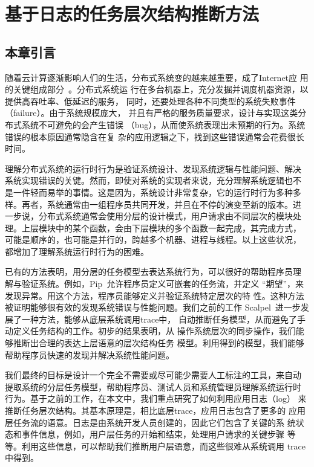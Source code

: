 \chapter{基于日志的任务层次结构推断方法}
\label{chap:logmining}

\section{本章引言}

随着云计算逐渐影响人们的生活，分布式系统变的越来越重要，成了Internet应
用的关键组成部分~\cite{gfs, mapreduce, bigtable, dynamo}。分布式系统运
行在多台机器上，充分发掘并调度机器资源，以提供高吞吐率、低延迟的服务，
同时，还要处理各种不同类型的系统失败事件（failure）。由于系统规模庞大，
并且有严格的服务质量要求，设计与实现这类分布式系统不可避免的会产生错误
（bug），从而使系统表现出未预期的行为。系统错误的根本原因通常隐含在复
杂的应用逻辑之下，找到这些错误通常会花费很长时间。

理解分布式系统的运行时行为是验证系统设计、发现系统逻辑与性能问题、解决
系统实现错误的关键。然而，即使对系统的实现者来说，充分理解系统逻辑也不
是一件轻而易举的事情。这是因为，系统设计非常复杂，它的运行时行为多种多
样。再者，系统通常由一组程序员共同开发，并且在不停的演变至新的版本。进
一步说，分布式系统通常会使用分层的设计模式，用户请求由不同层次的模块处
理。上层模块中的某个函数，会由下层模块的多个函数一起完成，其完成方式，
可能是顺序的，也可能是并行的，跨越多个机器、进程与线程。以上这些状况，
都增加了理解系统运行时行为的困难。

已有的方法表明，用分层的任务模型去表达系统行为，可以很好的帮助程序员理
解与验证系统。例如，Pip~\cite{pip}允许程序员定义可嵌套的任务流，并定义
“期望”，来发现异常。用这个方法，程序员能够定义并验证系统特定层次的特
性。这种方法被证明能够很有效的发现系统错误与性能问题。我们之前的工作
Scalpel~\cite{scalpel}进一步发展了一种方法，能够从底层系统调用trace中，
自动推断任务模型，从而避免了手动定义任务结构的工作。初步的结果表明，从
操作系统层次的同步操作，我们能够推断出合理的表达上层语意的层次结构任务
模型。利用得到的模型，我们能够帮助程序员快速的发现并解决系统性能问题。

我们最终的目标是设计一个完全不需要或尽可能少需要人工标注的工具，来自动
提取系统的分层任务模型，帮助程序员、测试人员和系统管理员理解系统运行时
行为。基于之前的工作，在本文中，我们重点研究了如何利用应用日志（log）
来推断任务层次结构。其基本原理是，相比底层trace，应用日志包含了更多的
应用层任务流的语意。日志是由系统开发人员创建的，因此它们包含了关键的系
统状态和事件信息，例如，用户层任务的开始和结束，处理用户请求的关键步骤
等等。利用这些信息，可以帮助我们推断用户层语意，而这些很难从系统调用
trace中得到。

